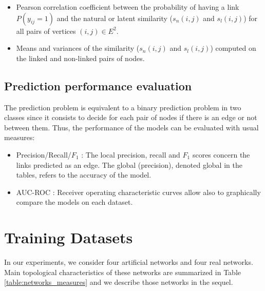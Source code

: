 \documentclass[a4paper, 12pt]{article}
\begin{document}
\begin{itemize}
    \item  Pearson correlation coefficient between the probability of having a link $P(y_{ij}=1)$  and the natural or latent similarity ($s_n(i,j)$ and $s_l(i,j)$) for all pairs of vertices $(i,j) \in E^2 $. 
    \item  Means and variances of the similarity ($s_n(i,j)$ and $s_l(i,j)$) computed on the linked and non-linked pairs of nodes.
\end{itemize}

\subsection{Prediction performance evaluation}
The prediction problem is equivalent to a binary prediction problem in two classes since it consists to decide for each pair of nodes if there is an edge or not between them. 
Thus, the performance of the models can be evaluated with usual measures:

\begin{itemize}

\item Precision/Recall/$F_1$ :  The local precision, recall and $F_1$ scores concern the links predicted as an edge.  The global (precision), denoted global in the tables, refers to the accuracy of the model. 
\item AUC-ROC : Receiver operating characteristic curves allow also to graphically compare the  models on each dataset.
\end{itemize}

\section{Training Datasets}

In our experiments, we consider four artificial networks and four real networks.  Main topological characteristics of these networks are summarized in Table \ref{table:networks_measures} and we describe those networks in the sequel.
\end{document}
